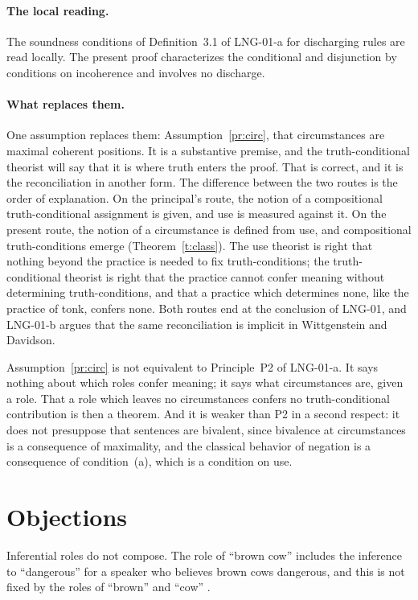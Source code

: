 \documentclass{situationist-preprint}
\begin{document}
\paragraph{The local reading.} The soundness conditions of Definition~3.1 of LNG-01-a for discharging rules are read locally. The present proof characterizes the conditional and disjunction by conditions on incoherence and involves no discharge.

\paragraph{What replaces them.} One assumption replaces them: Assumption~\ref{pr:circ}, that circumstances are maximal coherent positions. It is a substantive premise, and the truth-conditional theorist will say that it is where truth enters the proof. That is correct, and it is the reconciliation in another form. The difference between the two routes is the order of explanation. On the principal's route, the notion of a compositional truth-conditional assignment is given, and use is measured against it. On the present route, the notion of a circumstance is defined from use, and compositional truth-conditions emerge (Theorem~\ref{t:class}). The use theorist is right that nothing beyond the practice is needed to fix truth-conditions; the truth-conditional theorist is right that the practice cannot confer meaning without determining truth-conditions, and that a practice which determines none, like the practice of tonk, confers none. Both routes end at the conclusion of LNG-01, and LNG-01-b argues that the same reconciliation is implicit in Wittgenstein and Davidson.

Assumption~\ref{pr:circ} is not equivalent to Principle~P2 of LNG-01-a. It says nothing about which roles confer meaning; it says what circumstances are, given a role. That a role which leaves no circumstances confers no truth-conditional contribution is then a theorem. And it is weaker than P2 in a second respect: it does not presuppose that sentences are bivalent, since bivalence at circumstances is a consequence of maximality, and the classical behavior of negation is a consequence of condition~(a), which is a condition on use.

\section{Objections}\label{s:obj}

\begin{objection}[Compositionality]\label{o:comp}
Inferential roles do not compose. The role of \enquote{brown cow} includes the inference to \enquote{dangerous} for a speaker who believes brown cows dangerous, and this is not fixed by the roles of \enquote{brown} and \enquote{cow} \citep{FodorLepore1991,FodorLepore2001}.
\end{objection}
\end{document}

